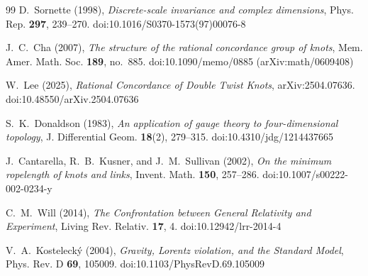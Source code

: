 \documentclass[11pt]{article}
\theoremstyle{definition}
\theoremstyle{plain}
\theoremstyle{remark}
\begin{document}
\begin{thebibliography}{99}
            D.~Sornette (1998),
            \emph{Discrete-scale invariance and complex dimensions},
            Phys. Rep. \textbf{297}, 239--270.
            doi:10.1016/S0370-1573(97)00076-8

            J.~C.~Cha (2007),
            \emph{The structure of the rational concordance group of knots},
            Mem. Amer. Math. Soc. \textbf{189}, no.~885.
            doi:10.1090/memo/0885
            (arXiv:math/0609408)

            W.~Lee (2025),
            \emph{Rational Concordance of Double Twist Knots},
            arXiv:2504.07636.
            doi:10.48550/arXiv.2504.07636

            S.~K.~Donaldson (1983),
            \emph{An application of gauge theory to four-dimensional topology},
            J. Differential Geom. \textbf{18}(2), 279--315.
            doi:10.4310/jdg/1214437665

            J.~Cantarella, R.~B.~Kusner, and J.~M.~Sullivan (2002),
            \emph{On the minimum ropelength of knots and links},
            Invent. Math. \textbf{150}, 257--286.
            doi:10.1007/s00222-002-0234-y

            C.~M.~Will (2014),
            \emph{The Confrontation between General Relativity and Experiment},
            Living Rev. Relativ. \textbf{17}, 4.
            doi:10.12942/lrr-2014-4

            V.~A.~Kosteleck\'y (2004),
            \emph{Gravity, Lorentz violation, and the Standard Model},
            Phys. Rev. D \textbf{69}, 105009.
            doi:10.1103/PhysRevD.69.105009

        \end{thebibliography}
\end{document}

